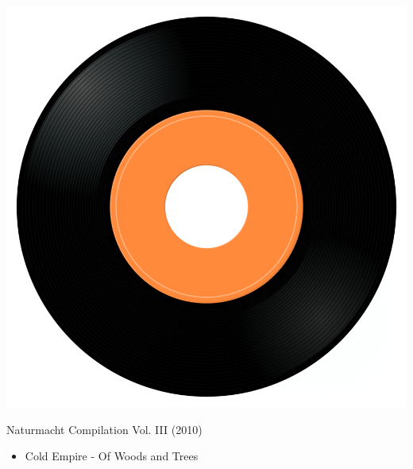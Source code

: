 \begin{minipage}[t]{0.25\textwidth}\vspace{0pt}
\captionsetup{type=figure}
\includegraphics[width=\textwidth]{Images/cover.png}
\caption*{Naturmacht Compilation Vol. III (2010)}
\end{minipage}
\begin{minipage}[t]{0.25\textwidth}\vspace{0pt}
\begin{itemize}[nosep,leftmargin=1em,labelwidth=*,align=left]
	\setlength{\itemsep}{0pt}
	\item Cold Empire - Of Woods and Trees
\end{itemize}
\end{minipage}
